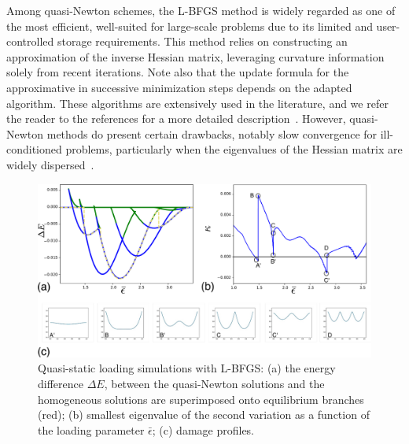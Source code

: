 Among quasi-Newton schemes, the L-BFGS method is widely regarded as one of the most efficient, well-suited for large-scale problems due to its limited and user-controlled storage requirements. This method relies on constructing an approximation of the inverse Hessian matrix, leveraging curvature information solely from recent iterations. Note also that the update formula for the approximative in successive minimization steps depends on the adapted algorithm. These algorithms are extensively used in the literature, and we refer the reader to the references for a more detailed description~\cite{Matthies1979-gl,Xu2001-ax,Nocedal1999-zr,Nocedal2006-qh,Simone2012-tx,Lewis2013-eu,Curtis2015-wp}. However, quasi-Newton methods do present certain drawbacks, notably slow convergence for ill-conditioned problems, particularly when the eigenvalues of the Hessian matrix are widely dispersed~\cite{Simone2012-tx}.
\begin{figure}
\includegraphics[scale=0.23]{final_images/fig5.pdf}
    \caption{
        Quasi-static loading simulations with L-BFGS: (a) the energy difference $\Delta E$, between the quasi-Newton solutions and the homogeneous solutions are superimposed onto equilibrium branches (red); (b) smallest eigenvalue of the second variation  as a function of the loading parameter $\bar\epsilon$; (c) damage profiles.}
    \label{fig:tempo2}
\end{figure}


